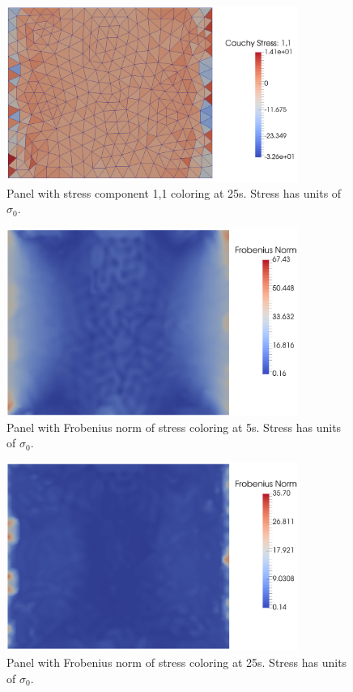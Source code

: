 \documentclass[conf]{new-aiaa}
\begin{document}
\begin{figure}[H] 
  \centering
    \includegraphics[width=0.85\textwidth, keepaspectratio]
    {panel_stress_25s}
  \caption{ Panel with stress component 1,1 coloring at 25s.
            Stress has units of $\sigma_0$.}
  \label{fig_panel_stress_25s}
\end{figure}

\begin{figure}[H] 
  \centering
    \includegraphics[width=0.85\textwidth, keepaspectratio]
    {panel_stress_frobenius_norm_5s}
  \caption{ Panel with Frobenius norm of stress coloring at 5s.
            Stress has units of $\sigma_0$.}
  \label{fig_panel_stress_frobenius_5s}
\end{figure}

\begin{figure}[H] 
  \centering
    \includegraphics[width=0.85\textwidth, keepaspectratio]
    {panel_stress_forbenius_norm_25s}
  \caption{ Panel with Frobenius norm of stress coloring at 25s.
            Stress has units of $\sigma_0$.}
  \label{fig_panel_stress_frobenius_25s}
\end{figure}
\end{document}
